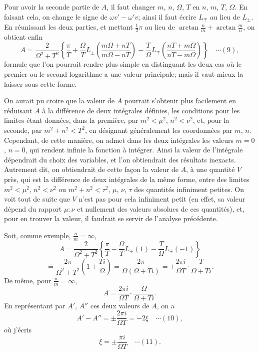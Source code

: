 \documentclass[12pt,a4paper]{article}
\begin{document}
\newpage
\setcounter{page}{161}

Pour avoir la seconde partie de $A$, il faut changer $m$, $n$, $\Omega$, $T$ en $n$, $m$, $T$, $\Omega$. En faisant cela, on change le signe de $\omega v' - \omega' v$; ainsi il faut \'ecrire $L_{\mp}$ au lieu de $L_{\pm}$. En r\'eunissant les deux parties, et mettant $\tfrac{1}{2}\pi$ au lieu de $\arctan\tfrac{n}{m} + \arctan\tfrac{m}{n}$, on obtient enfin
\[
A = \frac{2}{\Omega^2 + T^2}\!\left\{\frac{\pi}{T} + \frac{\Omega}{T}L_{\pm}\!\left(\frac{m\Omega + nT}{m\Omega - nT}\right) - \frac{T}{\Omega}L_{\mp}\!\left(\frac{nT + m\Omega}{nT - m\Omega}\right)\right\} \quad\cdots(9),
\]
formule que l'on pourrait rendre plus simple en distinguant les deux cas o\`u le premier ou le second logarithme a une valeur principale; mais il vaut mieux la laisser sous cette forme.

On aurait pu croire que la valeur de $A$ pourrait s'obtenir plus facilement en r\'eduisant $A$ \`a la diff\'erence de deux int\'egrales d\'efinies, les conditions pour les limites \'etant donn\'ees, dans la premi\`ere, par $m^2 < \mu^2$, $n^2 < \nu^2$, et, pour la seconde, par $m^2 + n^2 < T^2$, en d\'esignant g\'en\'eralement les coordonn\'ees par $m$, $n$. Cependant, de cette mani\`ere, on admet dans les deux int\'egrales les valeurs $m = 0$, $n = 0$, qui rendent infinie la fonction \`a int\'egrer. Ainsi la valeur de l'int\'egrale d\'ependrait du choix des variables, et l'on obtiendrait des r\'esultats inexacts. Autrement dit, on obtiendrait de cette fa\c{c}on la valeur de $A$, \`a une quantit\'e $V$ pr\`es, qui est la diff\'erence de deux int\'egrales de la m\^eme forme, entre des limites $m^2 < \mu^2$, $n^2 < \nu^2$ ou $m^2 + n^2 < \tau^2$, $\mu$, $\nu$, $\tau$ des quantit\'es infiniment petites. On voit tout de suite que $V$ n'est pas pour cela infiniment petit (en effet, sa valeur d\'epend du rapport $\mu : \nu$ et nullement des valeurs absolues de ces quantit\'es), et, pour en trouver la valeur, il faudrait se servir de l'analyse pr\'ec\'edente.

Soit, comme exemple, $\tfrac{n}{m} = \infty$,
\[
A = \frac{2}{\Omega^2 + T^2}\!\left\{\frac{\pi}{T} - \frac{\Omega}{T}L_{\pm}(1) - \frac{T}{\Omega}L_{\mp}(-1)\right\}
\]
\[
= \frac{2\pi}{\Omega^2 + T^2}\!\left(1 \pm \frac{T i}{\Omega}\right) = \frac{2\pi}{\Omega(\Omega + Ti)} = \pm\frac{2\pi i}{\Omega T}\cdot\frac{T}{\Omega + Ti}.
\]
De m\^eme, pour $\tfrac{n}{m} = \infty$,
\[
A = \frac{2\pi i}{\Omega T}\cdot\frac{\Omega}{\Omega + Ti}.
\]
En repr\'esentant par $A'$, $A''$ ces deux valeurs de $A$, on a
\[
A' - A'' = \pm\frac{2\pi i}{\Omega T} = -2\xi \quad\cdots(10),
\]
o\`u j'\'ecris
\[
\xi = \pm\frac{\pi i}{\Omega T} \quad\cdots(11).
\]
\end{document}
